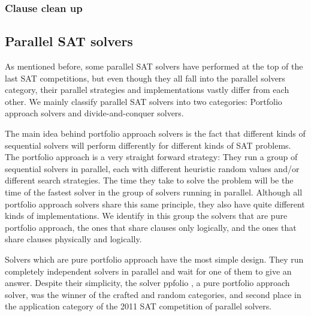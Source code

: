 \documentclass[12pt]{diicc}
\begin{document}
\subsubsection{Clause clean up}



\subsection{Parallel SAT solvers}

As mentioned before, some parallel SAT solvers have performed at the top of the last SAT competitions, but even though they all fall into the parallel solvers category, their parallel strategies and implementations vastly differ from each other. We mainly classify parallel SAT solvers into two categories: Portfolio approach solvers and divide-and-conquer solvers.

The main idea behind portfolio approach solvers is the fact that different kinds of sequential solvers will perform differently for different kinds of SAT problems. The portfolio approach is a very straight forward strategy: They run a group of sequential solvers in parallel, each with different heuristic random values and/or different search strategies. The time they take to solve the problem will be the time of the fastest solver in the group of solvers running in parallel. Although all portfolio approach solvers share this same principle, they also have quite different kinds of implementations. We identify in this group the solvers that are pure portfolio approach, the ones that share clauses only logically, and the ones that share clauses physically and logically.

Solvers which are pure portfolio approach have the most simple design. They run completely independent solvers in parallel and wait for one of them to give an answer. Despite their simplicity, the solver ppfolio \cite{ppfolio}, a pure portfolio approach solver, was the winner of the crafted and random categories, and second place in the application category of the 2011 SAT competition of parallel solvers. 
\end{document}
